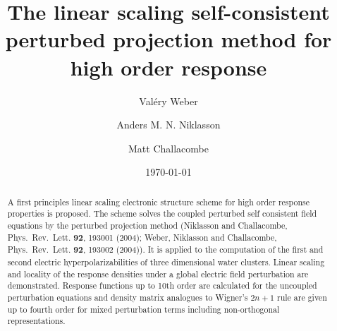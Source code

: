 \documentclass[prl,aps,twocolumn,showpacs,twocolumngrid,superbib]{revtex4}
\begin{document}
\title{The linear scaling self-consistent perturbed projection 
       method for high order response}

\author{Val\'ery Weber}
%
\author{Anders M. N. Niklasson}%
\author{Matt Challacombe}%

%

\date{\today}%

\begin{abstract}
A first principles linear scaling electronic structure scheme for high order 
response properties is proposed. The scheme solves the coupled perturbed self 
consistent field equations by the perturbed projection method (Niklasson and Challacombe, 
Phys.\ Rev.\ Lett. {\bf 92}, 193001 (2004); Weber, Niklasson and  Challacombe, 
Phys.\ Rev.\ Lett. {\bf 92}, 193002 (2004)). It is applied to the computation 
of the first and second electric hyperpolarizabilities of three
dimensional water clusters. Linear scaling and locality of the response
densities under a global electric field perturbation are demonstrated. 
Response functions up to 10th order are calculated for the uncoupled perturbation 
equations and density matrix analogues to Wigner's $2n+1$ rule are given up to fourth order
for mixed perturbation terms including non-orthogonal representations.
\end{abstract}

\maketitle
\end{document}
